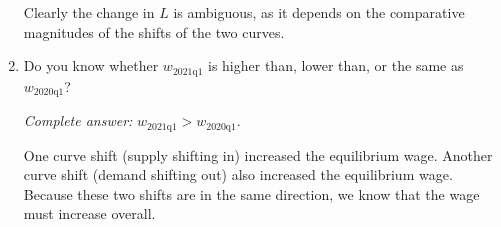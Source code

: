 \documentclass[
    letterpaper,paper=portrait,fleqn,
    DIV=16,fontsize=12pt,twoside=semi,
    parskip=full-,
    headings=standardclasses]
{scrartcl}
\begin{document}
\begin{enumerate}
\begin{solution}
Clearly the change in $L$ is ambiguous, as it depends on the comparative magnitudes of the shifts of the two curves.
\end{solution}

\item Do you know whether $w_\text{2021q1}$ is higher than, lower than, or the same as $w_\text{2020q1}$?

\begin{solution}
\emph{Complete answer:} $w_\text{2021q1} > w_\text{2020q1}$.

One curve shift (supply shifting in) increased the equilibrium wage. Another curve shift (demand shifting out) also increased the equilibrium wage. Because these two shifts are in the same direction, we know that the wage must increase overall.
\end{solution}

\end{enumerate}
\end{document}
